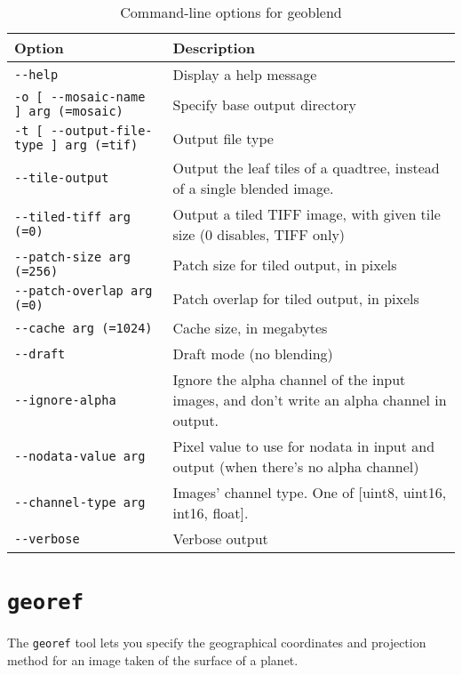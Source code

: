 \begin{longtable}{|l|p{9cm}|} 
\caption{Command-line options for geoblend}
\label{tbl:geoblend}
\endfirsthead
\endhead
\endfoot
\endlastfoot
\hline
Option & Description \\ \hline \hline
\verb#--help# & Display a help message \\ \hline
\verb#-o [ --mosaic-name ] arg (=mosaic)# & Specify base output directory\\ \hline
\verb#-t [ --output-file-type ] arg (=tif)# & Output file type\\ \hline
\verb#--tile-output# & Output the leaf tiles of a quadtree, instead of a single blended image.\\ \hline
\verb#--tiled-tiff arg (=0)# & Output a tiled TIFF image, with given tile size (0 disables, TIFF only)\\ \hline
\verb#--patch-size arg (=256)# & Patch size for tiled output, in pixels\\ \hline
\verb#--patch-overlap arg (=0)# & Patch overlap for tiled output, in pixels\\ \hline
\verb#--cache arg (=1024)# & Cache size, in megabytes\\ \hline
\verb#--draft# & Draft mode (no blending)\\ \hline
\verb#--ignore-alpha# & Ignore the alpha channel of the input images, and don't write an alpha channel in output.\\ \hline
\verb#--nodata-value arg# & Pixel value to use for nodata in input and output (when there's no alpha channel)\\ \hline
\verb#--channel-type arg# & Images' channel type. One of [uint8, uint16, int16, float].\\ \hline
\verb#--verbose# & Verbose output\\ \hline
\end{longtable}

\section{{\tt georef}}\label{sec:georef}

The \verb#georef# tool lets you specify the geographical coordinates and projection method for an image taken of the surface of a planet. 

